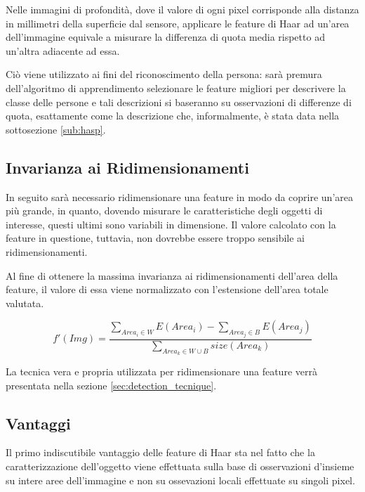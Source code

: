             Nelle immagini di profondità, dove il valore di ogni pixel corrisponde alla distanza in millimetri della superficie dal sensore, applicare le feature di Haar ad un'area dell'immagine equivale a misurare la differenza di quota media rispetto ad un'altra adiacente ad essa.

            Ciò viene utilizzato ai fini del riconoscimento della persona: sarà premura dell'algoritmo di apprendimento selezionare le feature migliori per descrivere la classe delle persone e tali descrizioni si baseranno su osservazioni di differenze di quota, esattamente come la descrizione che, informalmente, è stata data nella sottosezione \ref{sub:hasp}.

        \subsection{Invarianza ai Ridimensionamenti} %
        \label{sub:resize_invariance}
            In seguito sarà necessario ridimensionare una feature in modo da coprire un'area più grande, in quanto, dovendo misurare le caratteristiche degli oggetti di interesse, questi ultimi sono variabili in dimensione.
                Il valore calcolato con la feature in questione, tuttavia, non dovrebbe essere troppo sensibile ai ridimensionamenti.

                Al fine di ottenere la massima invarianza ai ridimensionamenti dell'area della feature, il valore di essa viene normalizzato con l'estensione dell'area totale valutata.

                \begin{equation}
                    f'(Img) = \frac
                    {\sum_{Area_i \in W}E(Area_i) - \sum_{Area_j \in B}E(Area_j)}
                    {\sum_{Area_k \in W \cup B}size(Area_k)}
                    \label{eq:haar_scale_invariant}
                \end{equation}

                La tecnica vera e propria utilizzata per ridimensionare una feature verrà presentata nella sezione \ref{sec:detection_tecnique}.

        \subsection{Vantaggi} %
        \label{sub:haar_feature_vantaggi}
            Il primo indiscutibile vantaggio delle feature di Haar sta nel fatto che la caratterizzazione dell'oggetto viene effettuata sulla base di osservazioni d'insieme su intere aree dell'immagine e non su ossevazioni locali effettuate su singoli pixel.

